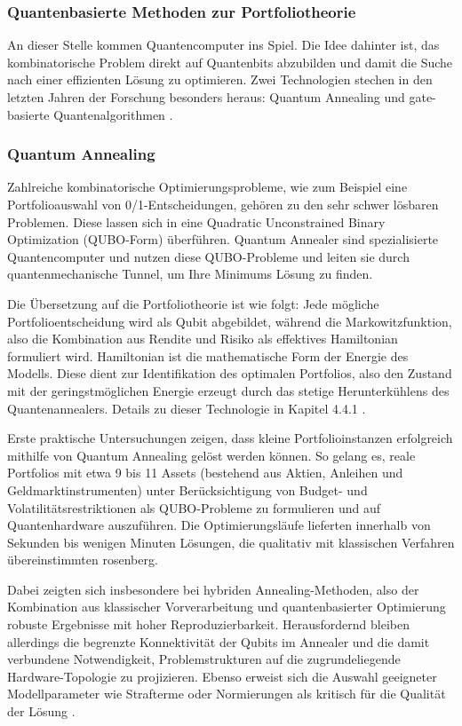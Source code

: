 \subsubsection*{Quantenbasierte Methoden zur Portfoliotheorie}

An dieser Stelle kommen Quantencomputer ins Spiel. Die Idee dahinter ist, das kombinatorische Problem direkt auf Quantenbits abzubilden und damit die Suche nach einer effizienten Lösung zu optimieren. Zwei Technologien stechen in den letzten Jahren der Forschung besonders heraus: Quantum Annealing und gate-basierte Quantenalgorithmen \cite{mugel_dynamic_2022, orus_quantum_2019}.

\subsubsection*{Quantum Annealing}
 
Zahlreiche kombinatorische Optimierungsprobleme, wie zum Beispiel eine Portfolioauswahl von 0/1-Entscheidungen, gehören zu den sehr schwer lösbaren Problemen. Diese lassen sich in eine Quadratic Unconstrained Binary Optimization (QUBO-Form) überführen. Quantum Annealer sind spezialisierte Quantencomputer und nutzen diese QUBO-Probleme und leiten sie durch quantenmechanische Tunnel, um Ihre Minimums Lösung zu finden. 

Die Übersetzung auf die Portfoliotheorie ist wie folgt: Jede mögliche Portfolioentscheidung wird als Qubit abgebildet, während die Markowitzfunktion, also die Kombination aus Rendite und Risiko als effektives Hamiltonian formuliert wird. Hamiltonian ist die mathematische Form der Energie des Modells. Diese dient zur Identifikation des optimalen Portfolios, also den Zustand mit der geringstmöglichen Energie erzeugt durch das stetige Herunterkühlens des Quantenannealers. Details zu dieser Technologie in Kapitel 4.4.1 \cite{mugel_dynamic_2022}.
 
Erste praktische Untersuchungen zeigen, dass kleine Portfolioinstanzen erfolgreich mithilfe von Quantum Annealing gelöst werden können. So gelang es, reale Portfolios mit etwa 9 bis 11 Assets (bestehend aus Aktien, Anleihen und Geldmarktinstrumenten) unter Berücksichtigung von Budget- und Volatilitätsrestriktionen als QUBO-Probleme zu formulieren und auf Quantenhardware auszuführen. Die Optimierungsläufe lieferten innerhalb von Sekunden bis wenigen Minuten Lösungen, die qualitativ mit klassischen Verfahren übereinstimmten \cite{sakuler_real-world_2025}rosenberg.
 
Dabei zeigten sich insbesondere bei hybriden Annealing-Methoden, also der Kombination aus klassischer Vorverarbeitung und quantenbasierter Optimierung robuste Ergebnisse mit hoher Reproduzierbarkeit. Herausfordernd bleiben allerdings die begrenzte Konnektivität der Qubits im Annealer und die damit verbundene Notwendigkeit, Problemstrukturen auf die zugrundeliegende Hardware-Topologie zu projizieren. Ebenso erweist sich die Auswahl geeigneter Modellparameter wie Strafterme oder Normierungen als kritisch für die Qualität der Lösung \cite{sakuler_real-world_2025}.
 

